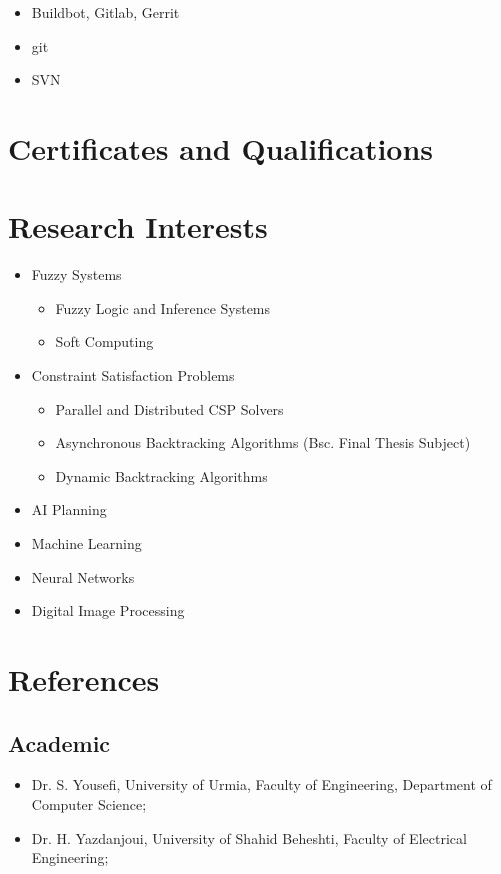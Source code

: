 \documentclass[11pt,a4paper,sans]{moderncv}        %
\begin{document}
{
\begin{itemize}
\item Buildbot, Gitlab, Gerrit
\end{itemize}
}
{
\begin{itemize}
\item git
\item SVN
\end{itemize}
}
\pagebreak
\section{Certificates and Qualifications}

\section{Research Interests}
{
\begin{itemize}
\item Fuzzy Systems
	\begin{itemize}
		\item Fuzzy Logic and Inference Systems
        \item Soft Computing
	\end{itemize}
\item Constraint Satisfaction Problems
	\begin{itemize}
		\item Parallel and Distributed CSP Solvers
		\item Asynchronous Backtracking Algorithms (Bsc. Final Thesis Subject)
		\item Dynamic Backtracking Algorithms
	\end{itemize}
\item AI Planning
\item Machine Learning
\item Neural Networks
\item Digital Image Processing
\end{itemize}
}

\section{References}
\subsection{Academic}
\begin{itemize}
\item Dr. S. Yousefi, University of Urmia, Faculty of Engineering, Department of Computer Science;
\item Dr. H. Yazdanjoui, University of Shahid Beheshti, Faculty of Electrical Engineering;
\end{itemize}
\end{document}
